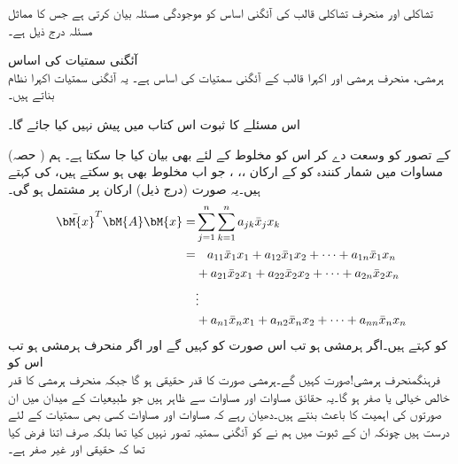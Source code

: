 تشاکلی اور منحرف تشاکلی قالب کی آئگنی اساس کو موجودگی مسئلہ   بیان کرتی ہے جس کا مماثل مسئلہ درج ذیل ہے۔

\quad آئگنی سمتیات کی اساس\\
ہرمشی، منحرف ہرمشی اور اکہرا قالب کے آئگنی سمتیات  کی اساس  ہے۔   یہ آئگنی سمتیات اکہرا نظام بناتے ہیں۔

اس مسئلے کا ثبوت اس کتاب میں پیش نہیں کیا جائے گا۔

 (حصہ ) کے تصور کو وسعت دے کر اس کو مخلوط کے لئے بھی بیان کیا جا سکتا ہے۔ ہم مساوات  میں شمار کنندہ 
 کو  کے ارکان ،، ، جو اب مخلوط بھی ہو سکتے ہیں، کی 
 کہتے ہیں۔یہ صورت (درج ذیل)  ارکان پر مشتمل ہو گی۔
\begin{gather}
\begin{aligned}\label{مساوات_آئگنی_ہرمشی_صورت_وغیرہ}
\bar{\bM{x}}^T\bM{A}\bM{x}=&\sum_{j=1}^{n}\sum_{k=1}^{n} a_{jk}\bar{x}_jx_k\\
=&\phantom{+\,}a_{11}\bar{x}_1x_1+a_{12}\bar{x}_1x_2+\cdots+a_{1n}\bar{x}_1x_n\\
&+a_{21}\bar{x}_2x_1+a_{22}\bar{x}_2x_2+\cdots+a_{2n}\bar{x}_2x_n\\
&\vdots\\
&+a_{n1}\bar{x}_n x_1+a_{n2}\bar{x}_n x_2+\cdots+a_{nn}\bar{x}_nx_n
\end{aligned}
\end{gather}
 کو  کہتے ہیں۔اگر  ہرمشی ہو تب اس صورت کو  کہیں گے اور اگر  منحرف ہرمشی ہو تب اس کو \\فرہنگ{منحرف ہرمشی!صورت} کہیں گے۔ہرمشی صورت کا قدر حقیقی ہو گا جبکہ منحرف ہرمشی کا قدر خالص خیالی یا صفر  ہو گا۔یہ حقائق مساوات  اور مساوات  سے ظاہر ہیں جو طبیعیات کے میدان میں ان صورتوں کی اہمیت کا باعث بنتے ہیں۔دھیان رہے کہ مساوات  اور مساوات  کسی بھی سمتیات کے لئے درست ہیں چونکہ ان کے ثبوت میں ہم نے  کو آئگنی سمتیہ تصور نہیں کیا تھا بلکہ صرف اتنا فرض کیا تھا کہ  حقیقی اور غیر صفر ہے۔

